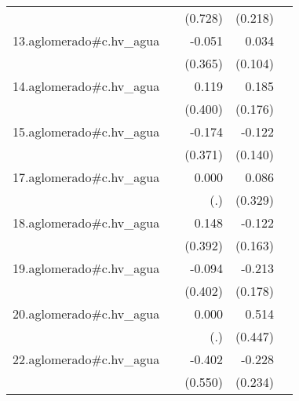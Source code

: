 {\begin{longtable}{l*{4}{D{.}{.}{-1}}}
            &                     &     (0.728)         &     (0.218)         &                     \\
\addlinespace
13.aglomerado#c.hv\_agua&                     &      -0.051         &       0.034         &                     \\
            &                     &     (0.365)         &     (0.104)         &                     \\
\addlinespace
14.aglomerado#c.hv\_agua&                     &       0.119         &       0.185         &                     \\
            &                     &     (0.400)         &     (0.176)         &                     \\
\addlinespace
15.aglomerado#c.hv\_agua&                     &      -0.174         &      -0.122         &                     \\
            &                     &     (0.371)         &     (0.140)         &                     \\
\addlinespace
17.aglomerado#c.hv\_agua&                     &       0.000         &       0.086         &                     \\
            &                     &         (.)         &     (0.329)         &                     \\
\addlinespace
18.aglomerado#c.hv\_agua&                     &       0.148         &      -0.122         &                     \\
            &                     &     (0.392)         &     (0.163)         &                     \\
\addlinespace
19.aglomerado#c.hv\_agua&                     &      -0.094         &      -0.213         &                     \\
            &                     &     (0.402)         &     (0.178)         &                     \\
\addlinespace
20.aglomerado#c.hv\_agua&                     &       0.000         &       0.514         &                     \\
            &                     &         (.)         &     (0.447)         &                     \\
\addlinespace
22.aglomerado#c.hv\_agua&                     &      -0.402         &      -0.228         &                     \\
            &                     &     (0.550)         &     (0.234)         &                     \\

\end{longtable}}
